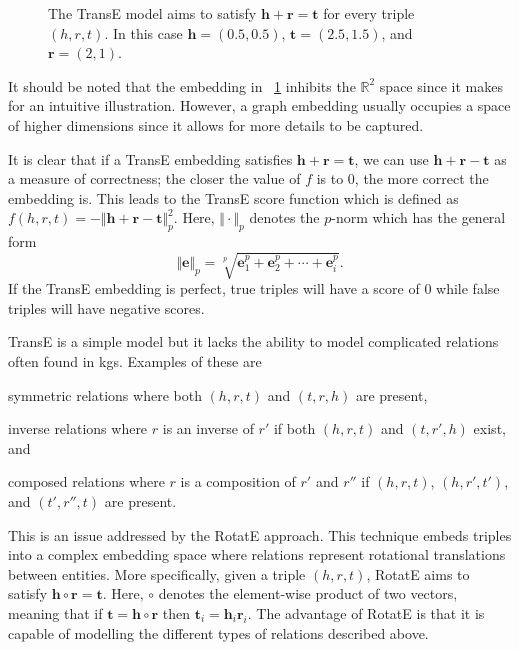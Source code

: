 \begin{figure}[ht]
  \centering\small
  
  \caption{%
    The TransE model\cite{Bordes2013} aims to satisfy $\bm{h} + \bm{r} = \bm{t}$ for every triple $(h, r, t)$.
    In this case $\bm{h} = (0.5, 0.5)$, $\bm{t} = (2.5, 1.5)$, and $\bm{r} = (2, 1)$.%
  }\label{fig:transe}
\end{figure}

It should be noted that the embedding in \figurename~\ref{fig:transe} inhibits the $\mathbb{R}^2$ space since it makes for an intuitive illustration.
However, a graph embedding usually occupies a space of higher dimensions since it allows for more details to be captured.

It is clear that if a TransE embedding satisfies $\bm{h} + \bm{r} = \bm{t}$, we can use $\bm{h} + \bm{r} - \bm{t}$ as a measure of correctness; the closer the value of $f$ is to $0$, the more correct the embedding is.
This leads to the TransE score function which is defined as $f(h, r, t) = - \Vert \bm{h} + \bm{r} - \bm{t} \Vert_p^2$.
Here, $\Vert\cdot\Vert_p$ denotes the $p$-norm which has the general form
\[\Vert \bm{e} \Vert_p = \sqrt[p]{\bm{e}_1^p + \bm{e}_2^p + \cdots + \bm{e}_i^p}.\]
If the TransE embedding is perfect, true triples will have a score of $0$ while false triples will have negative scores.

TransE is a simple model but it lacks the ability to model complicated relations often found in \acp{kg}.
Examples of these are
\begin{enumerate*}
  \item symmetric relations where both $(h, r, t)$ and $(t, r, h)$ are present,
  \item inverse relations where $r$ is an inverse of $r'$ if both $(h, r, t)$ and $(t, r', h)$ exist, and
  \item composed relations where $r$ is a composition of $r'$ and $r''$ if $(h, r, t)$, $(h, r', t')$, and $(t', r'', t)$ are present.
\end{enumerate*}
This is an issue addressed by the RotatE approach\cite{Sun2019}.
This technique embeds triples into a complex embedding space where relations represent rotational translations between entities.
More specifically, given a triple $(h, r, t)$, RotatE aims to satisfy $\bm{h} \circ \bm{r} = \bm{t}$.
Here, $\circ$ denotes the element-wise product of two vectors, meaning that if $\bm{t} = \bm{h} \circ \bm{r}$ then ${\bm{t}}_i = {\bm{h}}_i \bm{r}_i$.
The advantage of RotatE is that it is capable of modelling the different types of relations described above.

